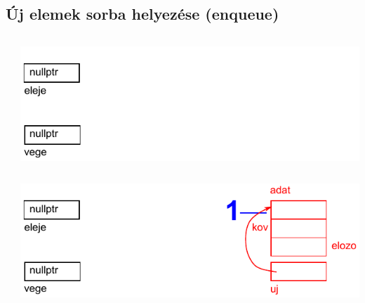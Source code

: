 \subsection{Új elemek sorba helyezése (enqueue)}
\begin{frame}
  \begin{columns}[c]
      \scriptsize
      \begin{exampleblock}{}
        \vspace{-.2cm}
        
        \vspace{-.2cm}
      \end{exampleblock}
      \includegraphics[width=\textwidth]{sor/sor01.pdf}
  \end{columns}
\end{frame}

\begin{frame}
  \begin{columns}[c]
      \scriptsize
      \begin{exampleblock}{}
        \vspace{-.2cm}
        
        \vspace{-.2cm}
      \end{exampleblock}
      \includegraphics[width=\textwidth]{sor/sor02.pdf}
  \end{columns}
\end{frame}

